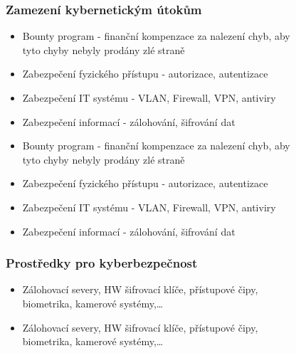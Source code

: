 \begin{figure}[h]
\subsubsection*{Zamezení kybernetickým útokům}
\begin{itemize}
  \item Bounty program - finanční kompenzace za nalezení chyb, aby tyto chyby nebyly prodány zlé straně
  \item Zabezpečení fyzického přístupu - autorizace, autentizace
  \item Zabezpečení IT systému - VLAN, Firewall, VPN, antiviry
  \item Zabezpečení informací - zálohování, šifrování dat
    \item Bounty program - finanční kompenzace za nalezení chyb, aby tyto chyby nebyly prodány zlé straně
    \item Zabezpečení fyzického přístupu - autorizace, autentizace
    \item Zabezpečení IT systému - VLAN, Firewall, VPN, antiviry
    \item Zabezpečení informací - zálohování, šifrování dat
\end{itemize}

\subsubsection*{Prostředky pro kyberbezpečnost}
\begin{itemize}
  \item Zálohovací severy, HW šifrovací klíče, přístupové čipy, biometrika, kamerové systémy,\dots
    \item Zálohovací severy, HW šifrovací klíče, přístupové čipy, biometrika, kamerové systémy,\dots
\end{itemize}


\end{figure}
